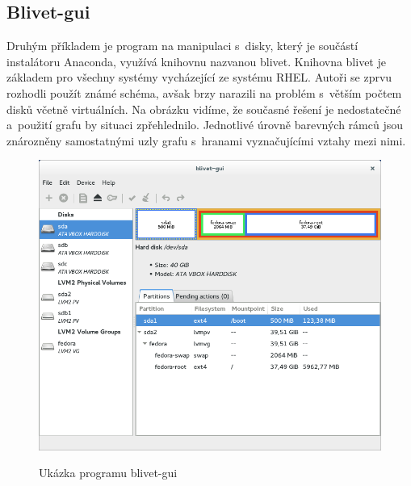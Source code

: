 \documentclass[a4paper,twosided]{article}
\begin{document}
\subsection{Blivet-gui}

Druhým příkladem je program na manipulaci s~disky, který je součástí instalátoru Anaconda, využívá knihovnu nazvanou blivet. Knihovna blivet je základem pro všechny systémy vycházející ze systému RHEL. Autoři 
se zprvu rozhodli použít známé schéma, avšak brzy narazili na problém s~větším počtem disků včetně virtuálních. Na obrázku vidíme, že současné řešení je nedostatečné a~použití grafu by
situaci zpřehlednilo. Jednotlivé úrovně barevných rámců jsou znározněny samostatnými uzly grafu s~hranami vyznačujícími vztahy mezi nimi. 
\printbibliography

\begin{figure}[hb]
\label{fig:blivet}
\caption{Ukázka programu blivet-gui~\cite{blivet-gui}}
\centering
\includegraphics[width=.8\columnwidth]{pics/blivet-gui-1.png}\\
\end{figure}
\end{document}

